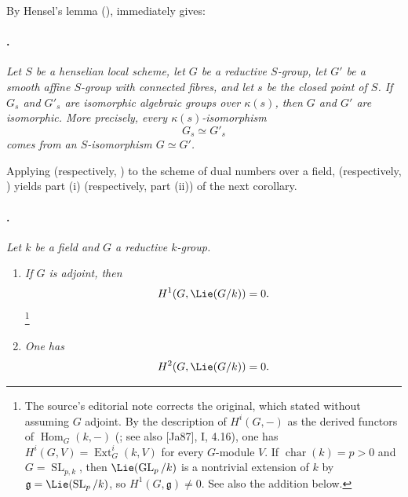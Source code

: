 By Hensel's lemma \textup{()},  immediately
gives:



\paragraph{.}
\emph{Let \(S\) be a henselian local scheme, let \(G\) be a
reductive \(S\)-group, let \(G'\) be a smooth affine \(S\)-group with
connected fibres, and let \(s\) be the closed point of \(S\). If
\(G_s\) and \(G'_s\) are isomorphic algebraic groups over
\(\kappa(s)\), then \(G\) and \(G'\) are isomorphic. More precisely,
every \(\kappa(s)\)-isomorphism}
\[
  G_s\simeq G'_s
\]
\emph{comes from an \(S\)-isomorphism \(G\simeq G'\).}

Applying  \textup{(respectively, )} to the
scheme of dual numbers over a field, 
\textup{(respectively, )} yields part \textup{(i)}
\textup{(respectively, part \textup{(ii)})} of the next corollary.

\paragraph{.}
\emph{Let \(k\) be a field and \(G\) a reductive \(k\)-group.}
\begin{enumerate}
\item[\SGAInlineRefTarget{sga3:xxiv:1.13:item:i}(i)] \emph{If \(G\) is adjoint, then}
\[
  H^1(G,\Lie(G/k))=0.
\]
\footnote{The source's editorial note corrects the original, which
stated \textup{} without assuming \(G\) adjoint. By the
description of \(H^i(G,-)\) as the derived functors of
\(\operatorname{Hom}_G(k,-)\) \textup{(; see also
[Ja87], I, 4.16)}, one has
\(H^i(G,V)=\operatorname{Ext}^i_G(k,V)\) for every \(G\)-module
\(V\). If \(\operatorname{char}(k)=p>0\) and
\(G=\operatorname{SL}_{p,k}\), then
\(\Lie(\operatorname{GL}_p/k)\) is a nontrivial extension of \(k\)
by \(\mathfrak g=\Lie(\operatorname{SL}_p/k)\), so
\(H^1(G,\mathfrak g)\neq0\). See also the addition  below.}
\item[\SGAInlineRefTarget{sga3:xxiv:1.13:item:ii}(ii)] \emph{One has}
\[
  H^2(G,\Lie(G/k))=0.
\]
\end{enumerate}

